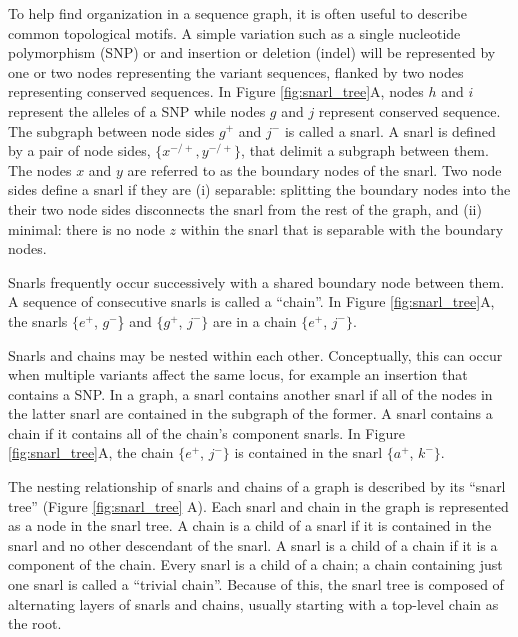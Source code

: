 \documentclass[11pt]{ucscthesis}
\begin{document}
To help find organization in a sequence graph, it is often useful to describe common topological motifs.
A simple variation such as a single nucleotide polymorphism (SNP) or and insertion or deletion (indel) will be represented by one or two nodes representing the variant sequences, flanked by two nodes representing conserved sequences.
In Figure \ref{fig:snarl_tree}A, nodes $h$ and $i$ represent the alleles of a SNP while nodes $g$ and $j$ represent conserved sequence.
The subgraph between node sides $g^+$ and $j^-$ is called a snarl.
A snarl is defined by a pair of node sides, $\{x^{-/+}, y^{-/+}\}$, that delimit a subgraph between them.
The nodes $x$ and $y$ are referred to as the boundary nodes of the snarl.
Two node sides define a snarl if they are (i) separable: splitting the boundary nodes into the their two node sides disconnects the snarl from the rest of the graph, and (ii) minimal: there is no node $z$ within the snarl that is separable with the boundary nodes.

Snarls frequently occur successively with a shared boundary node between them.
A sequence of consecutive snarls is called a ``chain''.
In Figure \ref{fig:snarl_tree}A, the snarls $\{e^+$, $g^-$\} and $\{g^+$, $j^-\}$ are in a chain $\{e^+$, $j^-\}$.

Snarls and chains may be nested within each other.
Conceptually, this can occur when multiple variants affect the same locus, for example an insertion that contains a SNP.
In a graph, a snarl contains another snarl if all of the nodes in the latter snarl are contained in the subgraph of the former.
A snarl contains a chain if it contains all of the chain's component snarls.
In Figure \ref{fig:snarl_tree}A, the chain $\{e^+$, $j^-\}$ is contained in the snarl $\{a^+$, $k^-\}$.

The nesting relationship of snarls and chains of a graph is described by its ``snarl tree'' (Figure \ref{fig:snarl_tree} A).
Each snarl and chain in the graph is represented as a node in the snarl tree.
A chain is a child of a snarl if it is contained in the snarl and no other descendant of the snarl.
A snarl is a child of a chain if it is a component of the chain.
Every snarl is a child of a chain; a chain containing just one snarl is called a ``trivial chain''.
Because of this, the snarl tree is composed of alternating layers of snarls and chains, usually starting with a top-level chain as the root.
\end{document}
